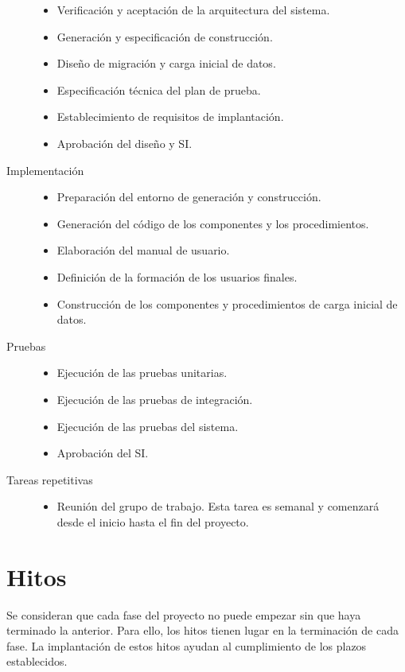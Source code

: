 \documentclass[11pt,a4paper,spanish,twoside]{report}
\begin{document}
\begin{description}
\begin{itemize}
  \item Verificación y aceptación de la arquitectura del sistema.
  \item Generación y especificación de construcción.
  \item Diseño de migración y carga inicial de datos.
  \item Especificación técnica del plan de prueba.
  \item Establecimiento de requisitos de implantación.
  \item Aprobación del diseño y SI.
  \end{itemize}
\item[Implementación]\hfill
  \begin{itemize}
  \item Preparación del entorno de generación y construcción.
  \item Generación del código de los componentes y los procedimientos.
  \item Elaboración del manual de usuario.
  \item Definición de la formación de los usuarios finales.
  \item Construcción de los componentes y procedimientos de carga inicial de
    datos. 
  \end{itemize}
\item[Pruebas] \hfill
  \begin{itemize}
  \item Ejecución de las pruebas unitarias.
  \item Ejecución de las pruebas de integración.
  \item Ejecución de las pruebas del sistema.
  \item Aprobación del SI.
  \end{itemize}
\item[Tareas repetitivas] \hfill
  \begin{itemize}
  \item Reunión del grupo de trabajo. Esta tarea es semanal y comenzará desde
    el inicio hasta el fin del proyecto.
  \end{itemize}
\end{description}
\section{Hitos}
Se consideran que cada fase del proyecto no puede empezar sin que haya
terminado la anterior. Para ello, los hitos tienen lugar en la terminación de
cada fase. La implantación de estos hitos ayudan al cumplimiento de los
plazos establecidos.
\end{document}
